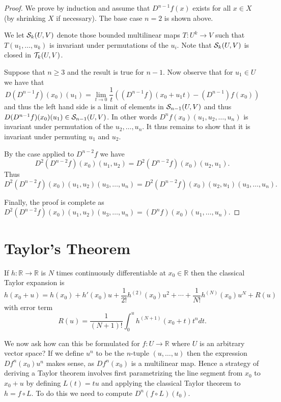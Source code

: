 \documentclass[twoside, a4paper, 10pt]{amsart}
\begin{document}
\begin{proof} We prove by induction and assume that $D^{n-1}f(x)$ exists for all $x \in X$ (by shrinking $X$ if necessary). The base case $n=2$ is shown above. 

We let $\mathcal{S}_{k}(U,V)$ denote those bounded multilinear maps $T:U^k \to V$ such that $T(u_1, \ldots, u_k)$ is invariant under permutations of the $u_i$. Note that $\mathcal{S}_{k}(U,V)$ is closed in $\mathcal{T}_k(U,V)$.

Suppose that $n \geq 3$ and the result is true for $n-1$. 
Now observe that for $u_1 \in U$ we have that  $$D(D^{n-1}f)(x_0)(u_1) = \lim_{t \to 0} \frac{1}{t}\left( (D^{n-1}f)(x_0 + u_1t) - (D^{n-1})f(x_0) \right)$$ and thus the left hand side is a limit of elements in $\mathcal{S}_{n-1}(U,V)$ and thus $D(D^{n-1}f)(x_0)(u_1) \in \mathcal{S}_{n-1}(U,V)$. In other words $D^{n}f(x_0)(u_1, u_2, \ldots, u_n)$ is invariant under permutation of the $u_2, \ldots, u_n$. It thus remains to show that it is invariant under permuting $u_1$ and $u_2$.

By the case applied to $D^{n-2}f$ we have $$D^2(D^{n-2}f)(x_0)(u_1,u_2) = D^2(D^{n-2}f)(x_0)(u_2,u_1).$$
Thus $$D^2(D^{n-2}f)(x_0)(u_1,u_2)(u_3, \ldots, u_n) = D^2(D^{n-2}f)(x_0)(u_2,u_1)(u_3, \ldots, u_n).$$

Finally, the proof is complete as $D^2(D^{n-2}f)(x_0)(u_1,u_2)(u_3, \ldots, u_n) = (D^{n}f)(x_0)(u_1, \ldots, u_n)$.
\end{proof}

\section{Taylor's Theorem}

If $h: \mathbb{R} \to \mathbb{R}$ is $N$ times continuously differentiable at $x_0 \in \mathbb{R}$ then the classical Taylor expansion is $$h(x_0 + u) = h(x_0) + h'(x_0)u + \frac{1}{2!}h^{(2)}(x_0)u^2 + \cdots + \frac{1}{N!}h^{(N)}(x_0)u^N + R(u)$$ with error term $$R(u) = \frac{1}{(N+1)!} \int_{0}^u h^{(N+1)}(x_0 + t) t^n dt.$$ 

We now ask how can this be formulated for $f:U \to \mathbb{R}$ where $U$ is an arbitrary vector space? If we define $u^n$ to be the $n$-tuple $(u, \ldots, u)$ then the expression $Df^n(x_0) u^n$ makes sense, as $Df^n(x_0)$ is a multilinear map. Hence a strategy of deriving a Taylor theorem involves first parametrizing the line segment from $x_0$ to $x_0 + u$ by defining $L(t) = tu$ and applying the classical Taylor theorem to $h = f \circ L$. To do this we need to compute $D^n(f \circ L) (t_0)$. 
\end{document}
